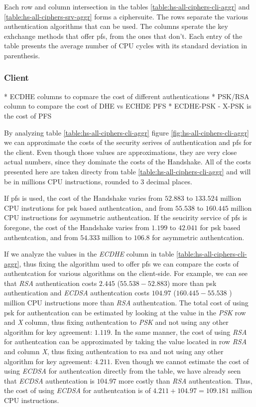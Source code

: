 \documentclass{llncs}
\begin{document}
Each row and column intersection in the tables \ref{table:hs-all-ciphers-cli-aggr} and \ref{table:hs-all-ciphers-srv-aggr} 
forms a ciphersuite. The rows separate the various authentication algorithms that can be used. The columns sperate the 
key exhchange methods that offer \gls{pfs}, from the ones that don't. Each entry of the table presents the average 
number of CPU cycles with its standard deviation in parenthesis.

\subsubsection{Client}

* ECDHE columns to copmare the cost of different authentications
* PSK/RSA column to compare the cost of DHE vs ECHDE PFS
* ECDHE-PSK - X-PSK is the cost of PFS


By analyzing table \ref{table:hs-all-ciphers-cli-aggr} figure \ref{fig:hs-all-ciphers-cli-aggr} we can approximate
the costs of the security serives of authentication and \gls{pfs} for the client. Even though those values are approximations, 
they are very close actual numbers, since they dominate the costs of the Handshake. All of the costs presented here
are taken directy from table \ref{table:hs-all-ciphers-cli-aggr} and will be in millions CPU instructions, 
rounded to $3$ decimal places. 

If \gls{pfs} is used, the cost of the Handshake varies from $52.883$ to $133.524$ 
million CPU instrutions for \gls{psk} based authentcation, and from $55.538$ to $160.445$ million CPU instructions for 
asymmetric authentcation. If the seucirity service of \gls{pfs} is foregone, the cost
of the Handshake varies from $1.199$  to $42.041$ for \gls{psk} based authentcation,
and from $54.333$ million to $106.8$ for asymmetric authentcation.

If we analyze the values in the \textit{ECDHE} column in table \ref{table:hs-all-ciphers-cli-aggr}, thus fixing the
algorithm used to offer \gls{pfs} we can compare the costs of authentcation for various algorithms on the client-side.
For example, we can see that \textit{RSA} authentication costs $2.445$  ($55.538 - 52.883$) more than \gls{psk} authentication and \textit{ECDSA} authentcation costs $104.97$ ($160.445 - 55.538$ ) million CPU instructions more than
\textit{RSA} authentcation. The total cost of using \gls{psk} for authentcation can be estimated by looking at the
value in the \textit{PSK} row and \textit{X} column, thus fixing authentcation to \textit{PSK} and not using any other
algorithm for key agreement: $1.119$. In the same manner, the cost of using \textit{RSA} for authentcation can
be approximated by taking the value located in row \textit{RSA} and column \textit{X}, thus fixing authentcation
to \gls{rsa} and not using any other algorithm for key agreement: $4.211$. Even though we cannot estimate the cost
of using \textit{ECDSA} for authentcation directly from the table, we have already seen that \textit{ECDSA} authentcation
is $104.97$ more costly than \textit{RSA} authentcation. Thus, the cost of using \textit{ECDSA} for authentcation
is of $4.211+104.97=109.181$ million CPU instructions.
\end{document}
